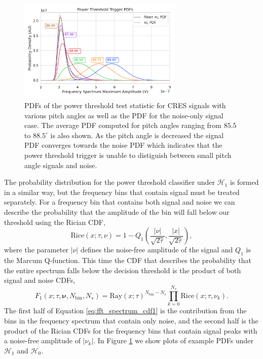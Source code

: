 \begin{figure}[htbp]
    \centering
    \includegraphics[width=0.7\textwidth]{figs/Chapter-4/230313_fft_power_threshold_pdf_by_pitch.png}
    \caption{PDFs of the power threshold test statistic for CRES signals with various pitch angles as well as the PDF for the noise-only signal case. The average PDF computed for pitch angles ranging from $85.5$ to $88.5^\circ$ is also shown. As the pitch angle is decreased the signal PDF converges towards the noise PDF which indicates that the power threshold trigger is unable to distiguish between small pitch angle signals and noise. }
    \label{fig:fft_pdf}
\end{figure}

The probability distribution for the power threshold classifier under $\mathcal{H}_1$ is formed in a similar way, but the frequency bins that contain signal must be treated separately. For a frequency bin that contains both signal and noise we can describe the probability that the amplitude of the bin will fall below our threshold using the Rician CDF,
\begin{equation}
    \mathrm{Rice}(x;\tau, \nu)=1-Q_1\left(\frac{|\nu|}{\sqrt{2\tau}},\frac{|x|}{\sqrt{2\tau}}\right),
\end{equation}
where the parameter $|\nu|$ defines the noise-free amplitude of the signal and $Q_1$ is the Marcum Q-function. This time the CDF that describes the probability that the entire spectrum falls below the decision threshold is the product of both signal and noise CDFs,
\begin{equation}
    F_1(x;\tau, \mathbf{\nu}, N_\mathrm{bin}, N_s)=\mathrm{Ray}(x;\tau)^{N_\mathrm{bin}-N_s}\prod_{k=0}^{N_s}{\mathrm{Rice}(x;\tau, \nu_k)}.
    \label{eq:fft_spectrum_cdf1}
\end{equation}
The first half of Equation \ref{eq:fft_spectrum_cdf1} is the contribution from the bins in the frequency spectrum that contain only noise, and the second half is the product of the Rician CDFs for the frequency bins that contain signal peaks with a noise-free amplitude of $|\nu_k|$. In Figure \ref{fig:fft_pdf} we show plots of example PDFs under $\mathcal{H}_1$ and $\mathcal{H}_0$.

